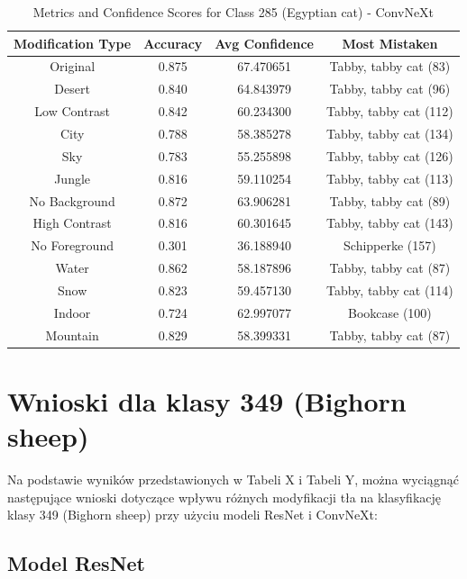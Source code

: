 \begin{table}
	\centering
	\begin{tabular}{|c|c|c|c|}
		\hline
		\textbf{Modification Type} & \textbf{Accuracy} & \textbf{Avg Confidence} & \textbf{Most Mistaken} \\
		\hline
		Original & 0.875 & 67.470651 & Tabby, tabby cat (83) \\
		\hline
		Desert & 0.840 & 64.843979 & Tabby, tabby cat (96) \\
		\hline
		Low Contrast & 0.842 & 60.234300 & Tabby, tabby cat (112) \\
		\hline
		City & 0.788 & 58.385278 & Tabby, tabby cat (134) \\
		\hline
		Sky & 0.783 & 55.255898 & Tabby, tabby cat (126) \\
		\hline
		Jungle & 0.816 & 59.110254 & Tabby, tabby cat (113) \\
		\hline
		No Background & 0.872 & 63.906281 & Tabby, tabby cat (89) \\
		\hline
		High Contrast & 0.816 & 60.301645 & Tabby, tabby cat (143) \\
		\hline
		No Foreground & 0.301 & 36.188940 & Schipperke (157) \\
		\hline
		Water & 0.862 & 58.187896 & Tabby, tabby cat (87) \\
		\hline
		Snow & 0.823 & 59.457130 & Tabby, tabby cat (114) \\
		\hline
		Indoor & 0.724 & 62.997077 & Bookcase (100) \\
		\hline
		Mountain & 0.829 & 58.399331 & Tabby, tabby cat (87) \\
		\hline
	\end{tabular}
	\caption{Metrics and Confidence Scores for Class 285 (Egyptian cat) - ConvNeXt}
	\label{tab:metrics_confidence_class_285_convnext}
\end{table}

\section*{Wnioski dla klasy 349 (Bighorn sheep)}

Na podstawie wyników przedstawionych w Tabeli X i Tabeli Y, można wyciągnąć następujące wnioski dotyczące wpływu różnych modyfikacji tła na klasyfikację klasy 349 (Bighorn sheep) przy użyciu modeli ResNet i ConvNeXt:

\subsection*{Model ResNet}



